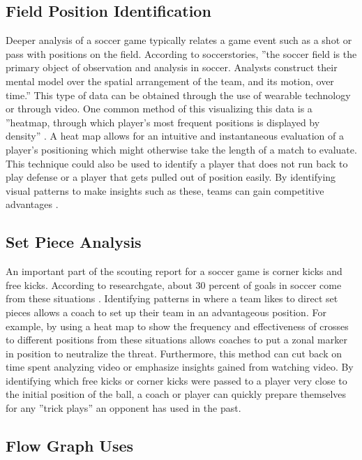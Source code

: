 \documentclass[sigconf]{acmart}
\begin{document}
\subsection{Field Position Identification}

Deeper analysis of a soccer game typically relates a game event such as a shot or pass with positions on the field. According to soccerstories, ''the soccer field is the primary object of observation and analysis in soccer. Analysts construct their mental model over the spatial arrangement of the team, and its motion, over time.''\cite{SoccerStories} This type of data can be obtained through the use of wearable technology or through video. One common method of this visualizing this data is a ''heatmap, through which player's most frequent positions is displayed by density'' \cite{SoccerStories}. A heat map allows for an intuitive and instantaneous evaluation of a player’s positioning which might otherwise take the length of a match to evaluate. This technique could also be used to identify a player that does not run back to play defense or a player that gets pulled out of position easily. By identifying visual patterns to make insights such as these, teams can gain competitive advantages \cite{SoccerStories}.

\subsection{Set Piece Analysis}

An important part of the scouting report for a soccer game is corner kicks and free kicks. According to researchgate, about 30 percent of goals in soccer come from these situations \cite{ResearchGate}. Identifying patterns in where a team likes to direct set pieces allows a coach to set up their team in an advantageous position. For example, by using a heat map to show the frequency and effectiveness of crosses to different positions from these situations allows coaches to put a zonal marker in position to neutralize the threat. Furthermore, this method can cut back on time spent analyzing video or emphasize insights gained from watching video. By identifying which free kicks or corner kicks were passed to a player very close to the initial position of the ball, a coach or player can quickly prepare themselves for any ''trick plays'' an opponent has used in the past.

\subsection{Flow Graph Uses}
\end{document}
